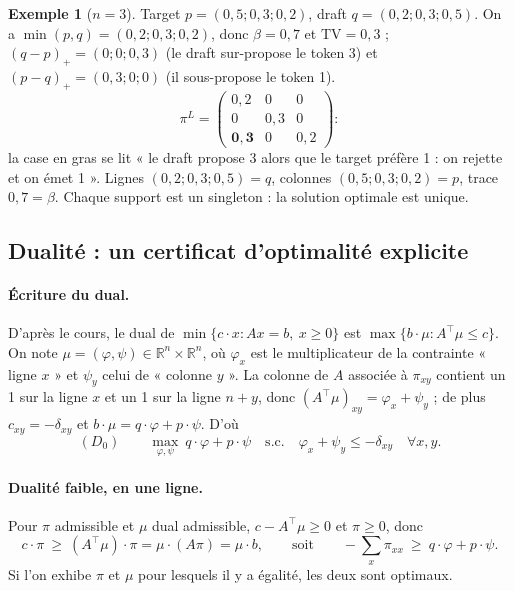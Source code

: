 \documentclass[11pt,a4paper]{article}
\newcommand{\R}{\mathbb{R}}
\newcommand{\TV}{\mathrm{TV}}
\theoremstyle{plain}
\theoremstyle{definition}
\newtheorem{exemple}{Exemple}
\begin{document}
\begin{exemple}[$n=3$]\label{ex:n3}
Target $p=(0{,}5;0{,}3;0{,}2)$, draft $q=(0{,}2;0{,}3;0{,}5)$.
On a $\min(p,q)=(0{,}2;0{,}3;0{,}2)$, donc $\beta=0{,}7$ et $\TV=0{,}3$ ; $(q-p)_+=(0;0;0{,}3)$ (le draft sur-propose le token 3) et $(p-q)_+=(0{,}3;0;0)$ (il sous-propose le token 1).
\[\pi^L=\begin{pmatrix}0{,}2&0&0\\0&0{,}3&0\\\mathbf{0{,}3}&0&0{,}2\end{pmatrix}:\]
la case en gras se lit « le draft propose 3 alors que le target préfère 1 : on rejette et on émet 1 ». Lignes $(0{,}2;0{,}3;0{,}5)=q$, colonnes $(0{,}5;0{,}3;0{,}2)=p$, trace $0{,}7=\beta$. Chaque support est un singleton : la solution optimale est unique.
\end{exemple}

\subsection{Dualité : un certificat d'optimalité explicite}\label{sec:dualite}
\paragraph{Écriture du dual.} D'après le cours, le dual de $\min\{c\cdot x:Ax=b,\ x\ge0\}$ est $\max\{b\cdot\mu:A^\top\mu\le c\}$. On note $\mu=(\varphi,\psi)\in\R^n\times\R^n$, où $\varphi_x$ est le multiplicateur de la contrainte « ligne $x$ » et $\psi_y$ celui de « colonne $y$ ». La colonne de $A$ associée à $\pi_{xy}$ contient un 1 sur la ligne $x$ et un 1 sur la ligne $n+y$, donc $(A^\top\mu)_{xy}=\varphi_x+\psi_y$ ; de plus $c_{xy}=-\delta_{xy}$ et $b\cdot\mu=q\cdot\varphi+p\cdot\psi$. D'où
\[(D_0)\qquad \max_{\varphi,\psi}\ q\cdot\varphi+p\cdot\psi\quad\text{s.c.}\quad \varphi_x+\psi_y\le-\delta_{xy}\quad\forall x,y.\]

\paragraph{Dualité faible, en une ligne.} Pour $\pi$ admissible et $\mu$ dual admissible, $c-A^\top\mu\ge0$ et $\pi\ge0$, donc
\[c\cdot\pi\ \ge\ (A^\top\mu)\cdot\pi=\mu\cdot(A\pi)=\mu\cdot b,\qquad\text{soit}\qquad -\sum_x\pi_{xx}\ \ge\ q\cdot\varphi+p\cdot\psi.\]
Si l'on exhibe $\pi$ et $\mu$ pour lesquels il y a égalité, les deux sont optimaux.
\end{document}
